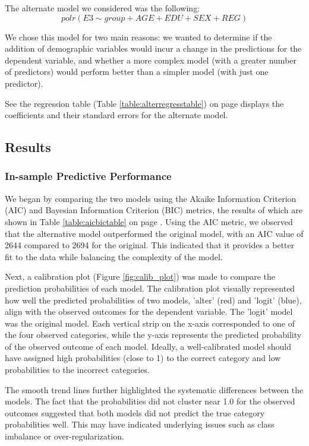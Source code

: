 \documentclass[titlepage]{article}
\begin{document}
\justify
The alternate model we considered was the following:
\begin{equation}
polr(E3 \sim group + AGE + EDU + SEX + REG)
\end{equation}

\justify
We chose this model for two main reasons: we wanted to determine if the addition of demographic variables would incur a change in the predictions for the dependent variable, and whether a more complex model (with a greater number of predictors) would perform better than a simpler model (with just one predictor).

\justify
See the regression table (Table \ref{table:alterregresstable}) on page \pageref{table:alterregresstable} displays the coefficients and their standard errors for the alternate model.

\subsection{Results}
\subsubsection{In-sample Predictive Performance}
We began by comparing the two models using the Akaike Information Criterion (AIC) and Bayesian Information Criterion (BIC) metrics, the results of which are shown in Table \ref{table:aicbictable} on page \pageref{table:aicbictable}. Using the AIC metric, we observed that the alternative model outperformed the original model, with an AIC value of 2644 compared to 2694 for the original. This indicated that it provides a better fit to the data while balancing the complexity of the model.

\justify
Next, a calibration plot (Figure \ref{fig:calib_plot}) was made to compare the prediction probabilities of each model. The calibration plot visually represented how well the predicted probabilities of two models, 'alter' (red) and 'logit' (blue), align with the observed outcomes for the dependent variable. The 'logit' model was the original model. Each vertical strip on the x-axis corresponded to one of the four observed categories, while the y-axis represents the predicted probability of the observed outcome of each model. Ideally, a well-calibrated model should have assigned high probabilities (close to 1) to the correct category and low probabilities to the incorrect categories.

\justify
The smooth trend lines further highlighted the systematic differences between the models. The fact that the probabilities did not cluster near 1.0 for the observed outcomes suggested that both models did not predict the true category probabilities well. This may have indicated underlying issues such as class imbalance or over-regularization.
\end{document}
